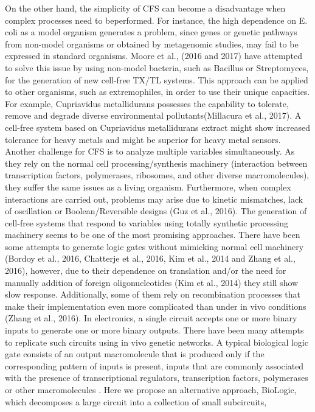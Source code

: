 On the other hand, the simplicity of CFS can become a disadvantage when complex processes need to beperformed. For instance, the high dependence on E. coli as a model organism generates a problem, since
genes or genetic pathways from non-model organisms or obtained by metagenomic studies, may fail to be
expressed in standard organisms. Moore et al., (2016 and 2017) have attempted to solve this issue by using
non-model bacteria, such as Bacillus or Streptomyces, for the generation of new cell-free TX/TL systems.
This approach can be applied to other organisms, such as extremophiles, in order to use their unique
capacities. For example, Cupriavidus metallidurans possesses the capability to tolerate, remove and
degrade diverse environmental pollutants(Millacura et al., 2017). A cell-free system based on Cupriavidus
metallidurans
extract might show increased tolerance for heavy metals and might be superior for heavy
metal sensors.
Another challenge for CFS is to analyze multiple variables simultaneously. As they rely on the normal cell
processing/synthesis machinery (interaction between transcription factors, polymerases, ribosomes, and
other diverse macromolecules), they suffer the same issues as a living organism. Furthermore, when
complex interactions are carried out, problems may arise due to kinetic mismatches, lack of oscillation or
Boolean/Reversible designs (Guz et al., 2016). The generation of cell-free systems that respond to variables
using totally synthetic processing machinery seems to be one of the most promising approaches. There
have been some attempts to generate logic gates without mimicking normal cell machinery (Bordoy et al.,
2016, Chatterje et al., 2016, Kim et al., 2014 and Zhang et al., 2016), however, due to their dependence on
translation and/or the need for manually addition of foreign oligonucleotides (Kim et al., 2014) they still show
slow response. Additionally, some of them rely on recombination processes that make their implementation
even more complicated than under in vivo conditions (Zhang et al., 2016).
In electronics, a single circuit accepts one or more binary inputs to generate one or more binary outputs.
There have been many attempts to replicate such circuits using in vivo genetic networks. A typical biological
logic gate consists of an output macromolecule that is produced only if the corresponding pattern of inputs is
present, inputs that are commonly associated with the presence of transcriptional regulators, transcription
factors, polymerases or other macromolecules \cite{silva2008mining} . Here we propose an
alternative approach, BioLogic, which decomposes a large circuit into a collection of small subcircuits,
